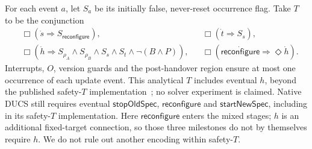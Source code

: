 For each event $a$, let $S_a$ be its initially false, never-reset occurrence flag. Take $T$ to be the conjunction
\[
\begin{aligned}
&\Box(\dot s\Rightarrow S_{\mathsf{reconfigure}}),
&&\Box(\dot t\Rightarrow S_s),\\
&\Box(\dot h\Rightarrow S_{\rho_A}\land S_{\rho_B}\land S_s\land S_t\land\neg(B\land P)),
&&\Box(\dot{\mathsf{reconfigure}}\Rightarrow\Diamond\dot h).
\end{aligned}
\]
Interrupts, $O$, version guards and the post-handover region ensure at most one occurrence of each update event. This analytical $T$ includes eventual $h$, beyond the published safety-$T$ implementation~\cite[Sec.~5.3]{Nahabedian2020}; no solver experiment is claimed.
Native DUCS still requires eventual $\mathsf{stopOldSpec}$, $\mathsf{reconfigure}$ and $\mathsf{startNewSpec}$, including in its safety-$T$ implementation. Here $\mathsf{reconfigure}$ enters the mixed stages; $h$ is an additional fixed-target connection, so those three milestones do not by themselves require $h$. We do not rule out another encoding within safety-$T$.

